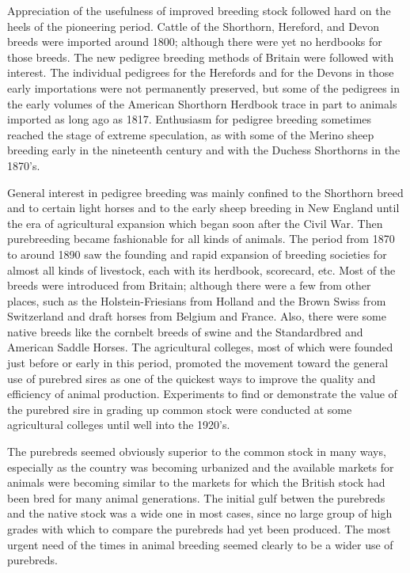 Appreciation of the usefulness of improved breeding stock followed hard on the heels of the pioneering period. Cattle of 
the Shorthorn, Hereford, and Devon breeds were imported around 1800; although there were yet no herdbooks for those breeds. 
The new pedigree breeding methods of Britain were followed with interest. The individual pedigrees for the Herefords and 
for the Devons in those early importations were not permanently preserved, but some of the pedigrees in the early volumes 
of the American Shorthorn Herdbook trace in part to animals imported as long ago as 1817. Enthusiasm for pedigree breeding
sometimes reached the stage of extreme speculation, as with some of the Merino sheep breeding early in the nineteenth 
century and with the Duchess Shorthorns in the 1870's.

General interest in pedigree breeding was mainly confined to the Shorthorn breed and to certain light horses and to the 
early sheep breeding in New England until the era of agricultural expansion which began soon after the Civil War. Then 
purebreeding became fashionable for all kinds of animals. The period from 1870 to around 1890 saw the founding and rapid 
expansion of breeding societies for almost all kinds of livestock, each with its herdbook, scorecard, etc. Most of the
breeds were introduced from Britain; although there were a few from other places, such as the Holstein-Friesians from 
Holland and the Brown Swiss from Switzerland and draft horses from Belgium and France. Also, there were some native breeds 
like the cornbelt breeds of swine and the Standardbred and American Saddle Horses. The agricultural colleges, most of which 
were founded just before or early in this period, promoted the movement toward the general use of purebred sires as one of 
the quickest ways to improve the quality and efficiency of animal production. Experiments to find or demonstrate the value 
of the purebred sire in grading up common stock were conducted at some agricultural colleges until well into the 1920's.

The purebreds seemed obviously superior to the common stock in many ways, especially as the country was becoming urbanized 
and the available markets for animals were becoming similar to the markets for which the British stock had been bred for 
many animal generations. The initial gulf betwen the purebreds and the native stock was a wide one in most cases, since no 
large group of high grades with which to compare the purebreds had yet been produced. The most urgent need of the times in 
animal breeding seemed clearly to be a wider use of purebreds.

